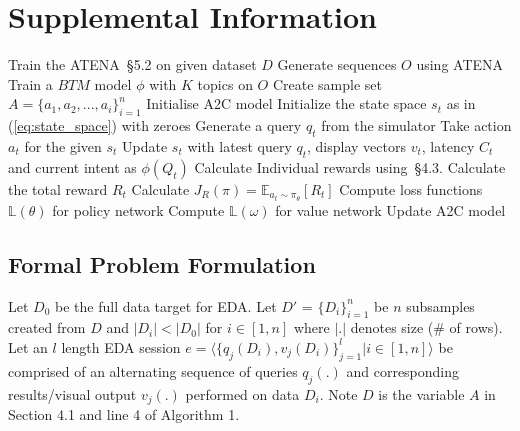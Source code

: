 \clearpage
\section{Supplemental Information}

\begin{algorithm}[th]
        \begin{algorithmic}[1]
        \label{alg:alg1}
        \caption{\name{}'s Training Algorithm}
        \STATE Train the ATENA~\S{5.2} on given dataset $D$
        \STATE Generate sequences $O$ using ATENA
        \STATE Train a $BTM$ model $\phi$ with $K$ topics on $O$
        \STATE Create sample set $A=\{a_1,a_2,...,a_i\}_{i=1}^n$
        \STATE Initialise A2C model
            \STATE Initialize the state space $s_t$ as in (\ref{eq:state_space}) with zeroes
                    \STATE Generate a query $q_t$ from the simulator
                    \STATE Take action $a_t$ for the given $s_t$
                    \STATE Update $s_t$ with latest query $q_t$, display vectors $v_t$, latency $C_t$ and current intent as $\phi(Q_t)$
            \ENDFOR
            \STATE Calculate Individual rewards using~\S{4.3}.
            \STATE Calculate the total reward $R_t$
            \STATE Calculate $J_R(\pi) = \mathbb{E}_{a_t \sim \pi_\theta}[R_t]$
            \STATE Compute loss functions $\mathbb{L}(\theta)$ for policy network
            \STATE Compute $\mathbb{L}(\omega)$ for value network
            \STATE Update A2C model
        \ENDFOR
        \end{algorithmic}
    \end{algorithm}

\subsection{Formal Problem Formulation}
\label{sec:problem}
%


%
Let $D_0$ be the full data target for EDA.
Let $D'$ = $\{D_i\}_{i=1}^n$ be $n$ subsamples created from $D$ and $|D_i| < |D_0|$ for $i \in [1, n]$ where $|.|$ denotes size (\# of rows). 
Let an $l$ length EDA session $e=\langle \{q_j(D_i), v_j(D_i)\}_{j=1}^l | i \in [1,n]\rangle$ be comprised of an alternating sequence of queries $q_j(.)$ and corresponding results/visual output $v_j(.)$ performed on data $D_i$. 
Note $D$ is the variable $A$ in Section 4.1 and line 4 of Algorithm 1.
%

